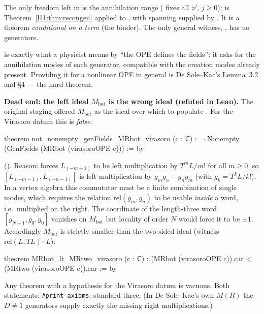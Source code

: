 \begin{dictionary}
The only freedom left in  is the annihilation range ( fixes all $z^j$, $j\ge0$);  is
Theorem~\ref{l11:thm:recongen} applied to , with spanning supplied by . It is a theorem
\emph{conditional on a term}  (the  binder). The only general witness, ,
has no generators.
\end{dictionary}

\begin{physics}
 is exactly what a physicist means by ``the OPE defines the fields'': it asks for the annihilation modes of each
generator, compatible with the creation modes already present. Providing it for a nonlinear OPE in general is De Sole--Kac's
Lemma~3.2 and \S4 --- the hard theorem.
\end{physics}

\begin{warning}
\textbf{Dead end: the left ideal $M_{\mathrm{bot}}$ is the wrong ideal (refuted in Lean).} The original staging offered
$M_{\mathrm{bot}}$ as the ideal over which to populate . For the Virasoro datum this is \emph{false}:
\begin{leancode}
theorem not_nonempty_genFields_MRbot_virasoro (c : ℂ) :
    ¬ Nonempty (GenFields (MRbot (virasoroOPE c))) := by
\end{leancode}
(). Reason:  forces $L_{(-m-1)}$ to be left
multiplication by $T^mL/m!$ for all $m\ge0$, so $[L_{(-m-1)},L_{(-n-1)}]$ is left multiplication by $g_mg_n - g_ng_m$
(with $g_k = T^kL/k!$). In a vertex algebra this commutator must be a finite combination of single modes, which requires the
relation $\mathrm{rel}(g_m,g_n)$ to be usable \emph{inside} a word, i.e.\ multiplied on the right. The coordinate of the
length-three word $[g_{N+1},g_0,g_0]$ vanishes on $M_{\mathrm{bot}}$ but locality of order $N$ would force it to be $\pm1$.
Accordingly $M_{\mathrm{bot}}$ is strictly smaller than the two-sided ideal (witness $\mathrm{rel}(L,TL)\cdot L$):
\begin{leancode}
theorem MRbot_lt_MRtwo_virasoro (c : ℂ) :
    (MRbot (virasoroOPE c)).car < (MRtwo (virasoroOPE c)).car := by
\end{leancode}
Any theorem with a hypothesis \allowbreak\lean{)} for the Virasoro datum is vacuous. Both statements:
\texttt{\#print axioms}: standard three. (In De Sole--Kac's own $M(R)$ the $D\neq1$ generators supply exactly the missing
right multiplications.)
\end{warning}

